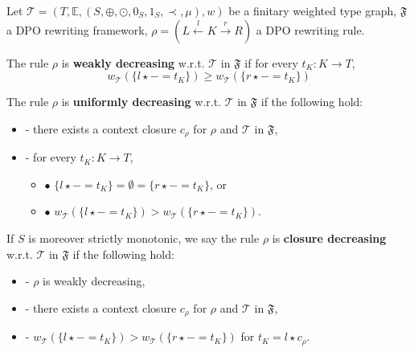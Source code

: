 \begin{definition}
    \label{def:decreasing_rule}
    Let $\mathcal{T} = (T,\mathbb{E}, (S, \oplus, \odot, 0_S, 1_S, \prec, \mu), w)$ be a finitary weighted type graph, \(\mathfrak{F}\) a DPO rewriting framework, $\rho = (L \overset{l}{\leftarrow} K \overset{r}{\rightarrow} R)$ a DPO rewriting rule.

    \noindent
    The rule $\rho$ is \textbf{weakly decreasing} w.r.t. $\mathcal{T}$ in $\mathfrak{F}$ if 
            for every $t_K : K \to T$,
                $$ 
                  w_\mathcal{T}(\{l \star - = t_K\}) \geq w_\mathcal{T}(\{r\star - = t_K\})$$
           
    \noindent
    The rule $\rho$ is \textbf{uniformly decreasing} w.r.t. $\mathcal{T}$ in $\mathfrak{F}$ if the following hold:
        \begin{itemize}
            \item[]- there exists a context closure $c_\rho$ for $\rho$ and $\mathcal{T}$ in $\mathfrak{F}$, 
            \item[]- for every $t_K : K \to T$,
            \begin{itemize}
                \item[] $\bullet$ $\{l \star - = t_K\} = \emptyset = \{r \star - = t_K\}$, or
                \item[] $\bullet$ $w_\mathcal{T}(\{l \star - = t_K\}) >   w_\mathcal{T}(\{r \star - = t_K\}) $.
            \end{itemize}
        \end{itemize}  
         
    \noindent
   If $S$ is moreover strictly monotonic, we say the rule $\rho$ is
            \textbf{closure decreasing} w.r.t. $\mathcal{T}$ in $\mathfrak{F}$ if the following hold:
            \begin{itemize}
                \item[]- $\rho$ is weakly decreasing,
                \item[]- there exists a context closure $c_\rho$ for $\rho$ and $\mathcal{T}$ in $\mathfrak{F}$,
                \item[]- $w_\mathcal{T}(\{l \star - = t_K\})  >  w_\mathcal{T}(\{r \star - = t_K\})$ for $t_K = l \star c_\rho$.
            \end{itemize}
\end{definition}


